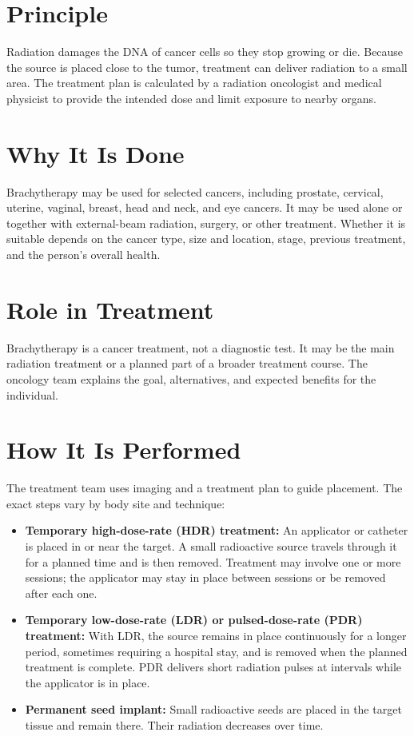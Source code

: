 \section*{Principle}
Radiation damages the DNA of cancer cells so they stop growing or die. Because the source is placed close to the tumor, treatment can deliver radiation to a small area. The treatment plan is calculated by a radiation oncologist and medical physicist to provide the intended dose and limit exposure to nearby organs.

\section*{Why It Is Done}
Brachytherapy may be used for selected cancers, including prostate, cervical, uterine, vaginal, breast, head and neck, and eye cancers. It may be used alone or together with external-beam radiation, surgery, or other treatment. Whether it is suitable depends on the cancer type, size and location, stage, previous treatment, and the person's overall health.

\section*{Role in Treatment}
Brachytherapy is a cancer treatment, not a diagnostic test. It may be the main radiation treatment or a planned part of a broader treatment course. The oncology team explains the goal, alternatives, and expected benefits for the individual.

\section*{How It Is Performed}
The treatment team uses imaging and a treatment plan to guide placement. The exact steps vary by body site and technique:
\begin{itemize}
  \item \textbf{Temporary high-dose-rate (HDR) treatment:} An applicator or catheter is placed in or near the target. A small radioactive source travels through it for a planned time and is then removed. Treatment may involve one or more sessions; the applicator may stay in place between sessions or be removed after each one.
  \item \textbf{Temporary low-dose-rate (LDR) or pulsed-dose-rate (PDR) treatment:} With LDR, the source remains in place continuously for a longer period, sometimes requiring a hospital stay, and is removed when the planned treatment is complete. PDR delivers short radiation pulses at intervals while the applicator is in place.
  \item \textbf{Permanent seed implant:} Small radioactive seeds are placed in the target tissue and remain there. Their radiation decreases over time.
\end{itemize}

